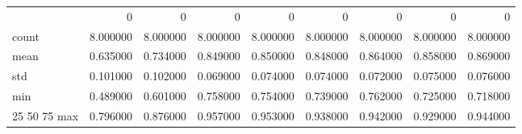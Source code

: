\begin{tabular}{lrrrrrrrr}
 & 0 & 0 & 0 & 0 & 0 & 0 & 0 & 0 \\
count & 8.000000 & 8.000000 & 8.000000 & 8.000000 & 8.000000 & 8.000000 & 8.000000 & 8.000000 \\
mean & 0.635000 & 0.734000 & 0.849000 & 0.850000 & 0.848000 & 0.864000 & 0.858000 & 0.869000 \\
std & 0.101000 & 0.102000 & 0.069000 & 0.074000 & 0.074000 & 0.072000 & 0.075000 & 0.076000 \\
min & 0.489000 & 0.601000 & 0.758000 & 0.754000 & 0.739000 & 0.762000 & 0.725000 & 0.718000 \\
25%
50%
75%
max & 0.796000 & 0.876000 & 0.957000 & 0.953000 & 0.938000 & 0.942000 & 0.929000 & 0.944000 \\
\end{tabular}
